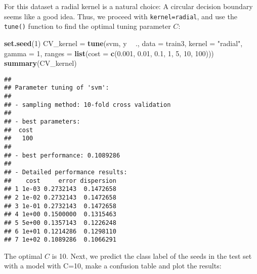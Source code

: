 \documentclass[10pt,ignorenonframetext,]{beamer}
\newenvironment{Shaded}{\begin{snugshade}}{\end{snugshade}}
\newcommand{\KeywordTok}[1]{\textcolor[rgb]{0.13,0.29,0.53}{\textbf{#1}}}
\newcommand{\DataTypeTok}[1]{\textcolor[rgb]{0.13,0.29,0.53}{#1}}
\newcommand{\DecValTok}[1]{\textcolor[rgb]{0.00,0.00,0.81}{#1}}
\newcommand{\FloatTok}[1]{\textcolor[rgb]{0.00,0.00,0.81}{#1}}
\newcommand{\StringTok}[1]{\textcolor[rgb]{0.31,0.60,0.02}{#1}}
\newcommand{\OperatorTok}[1]{\textcolor[rgb]{0.81,0.36,0.00}{\textbf{#1}}}
\newcommand{\NormalTok}[1]{#1}
\begin{document}
\begin{frame}[fragile]

For this dataset a radial kernel is a natural choice: A circular
decision boundary seems like a good idea. Thus, we proceed with
\texttt{kernel=\textquotesingle{}radial\textquotesingle{}}, and use the
\texttt{tune()} function to find the optimal tuning parameter \(C\):

\footnotesize

\begin{Shaded}
\begin{Highlighting}[]
\KeywordTok{set.seed}\NormalTok{(}\DecValTok{1}\NormalTok{)}
\NormalTok{CV_kernel =}\StringTok{ }\KeywordTok{tune}\NormalTok{(svm, y }\OperatorTok{~}\StringTok{ }\NormalTok{., }\DataTypeTok{data =}\NormalTok{ train3, }\DataTypeTok{kernel =} \StringTok{"radial"}\NormalTok{, }\DataTypeTok{gamma =} \DecValTok{1}\NormalTok{, }
    \DataTypeTok{ranges =} \KeywordTok{list}\NormalTok{(}\DataTypeTok{cost =} \KeywordTok{c}\NormalTok{(}\FloatTok{0.001}\NormalTok{, }\FloatTok{0.01}\NormalTok{, }\FloatTok{0.1}\NormalTok{, }\DecValTok{1}\NormalTok{, }\DecValTok{5}\NormalTok{, }\DecValTok{10}\NormalTok{, }\DecValTok{100}\NormalTok{)))}
\KeywordTok{summary}\NormalTok{(CV_kernel)}
\end{Highlighting}
\end{Shaded}

\begin{verbatim}
## 
## Parameter tuning of 'svm':
## 
## - sampling method: 10-fold cross validation 
## 
## - best parameters:
##  cost
##   100
## 
## - best performance: 0.1089286 
## 
## - Detailed performance results:
##    cost     error dispersion
## 1 1e-03 0.2732143  0.1472658
## 2 1e-02 0.2732143  0.1472658
## 3 1e-01 0.2732143  0.1472658
## 4 1e+00 0.1500000  0.1315463
## 5 5e+00 0.1357143  0.1226248
## 6 1e+01 0.1214286  0.1298110
## 7 1e+02 0.1089286  0.1066291
\end{verbatim}

\normalsize

\end{frame}

\begin{frame}[fragile]

The optimal \(C\) is 10. Next, we predict the class label of the seeds
in the test set with a model with C=10, make a confusion table and plot
the results:

\begin{Shaded}
\end{Shaded}

\end{frame}
\end{document}
